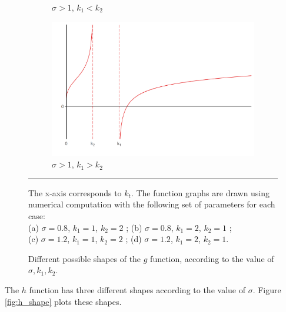 \begin{figure}[tb]
\begin{subfigure}[b]{0.5\linewidth}
		\caption{$\sigma > 1$, $k_1 < k_2$}
		\label{fig:g_shape_c}
	\end{subfigure}
	\begin{subfigure}[b]{0.5\linewidth}
		\centering
		\includegraphics[width=1\linewidth]{../result/appendix_A/function_g/graph_d.png}
		\caption{$\sigma > 1$, $k_1 > k_2$}
		\label{fig:g_shape_d}
	\end{subfigure} 
	\caption{Different possible shapes of the $g$ function, according to the value of $\sigma, k_1, k_2$.}
	\label{fig:g_shape}
	\vspace{.5ex}
	\hrule
	\vspace{-4ex}
	\justify\singlespacing\footnotesize The x-axis corresponds to $k_t$. The function graphs are drawn using numerical computation with the following set of parameters for each case:\\
	(a) $\sigma = 0.8$, $k_1 = 1$, $k_2 = 2$ ; \hspace{2ex}(b) $\sigma = 0.8$, $k_1 = 2$, $k_2 = 1$ ; \\(c) $\sigma = 1.2$, $k_1 = 1$, $k_2 = 2$ ; \hspace{2ex}(d) $\sigma = 1.2$, $k_1 = 2$, $k_2 = 1$.
\end{figure}
The $h$ function has three different shapes according to the value of $\sigma$. Figure \ref{fig:h_shape} plots these shapes.

